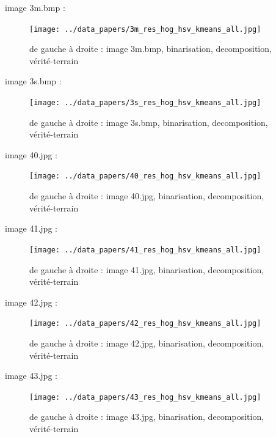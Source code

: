 \documentclass{book}
\begin{document}
image 3m.bmp : 
\begin{figure}[H]
\begin{center}
\texttt{[image: ../data\_papers/3m\_res\_hog\_hsv\_kmeans\_all.jpg]}
\end{center}
\caption{de gauche à droite : image 3m.bmp, binarisation, decomposition, vérité-terrain}
\label{3m}
\end{figure}
\clearpage


image 3s.bmp : 
\begin{figure}[H]
\begin{center}
\texttt{[image: ../data\_papers/3s\_res\_hog\_hsv\_kmeans\_all.jpg]}
\end{center}
\caption{de gauche à droite : image 3s.bmp, binarisation, decomposition, vérité-terrain}
\label{3s}
\end{figure}
\clearpage


image 40.jpg : 
\begin{figure}[H]
\begin{center}
\texttt{[image: ../data\_papers/40\_res\_hog\_hsv\_kmeans\_all.jpg]}
\end{center}
\caption{de gauche à droite : image 40.jpg, binarisation, decomposition, vérité-terrain}
\label{40}
\end{figure}
\clearpage


image 41.jpg : 
\begin{figure}[H]
\begin{center}
\texttt{[image: ../data\_papers/41\_res\_hog\_hsv\_kmeans\_all.jpg]}
\end{center}
\caption{de gauche à droite : image 41.jpg, binarisation, decomposition, vérité-terrain}
\label{41}
\end{figure}
\clearpage


image 42.jpg : 
\begin{figure}[H]
\begin{center}
\texttt{[image: ../data\_papers/42\_res\_hog\_hsv\_kmeans\_all.jpg]}
\end{center}
\caption{de gauche à droite : image 42.jpg, binarisation, decomposition, vérité-terrain}
\label{42}
\end{figure}
\clearpage


image 43.jpg : 
\begin{figure}[H]
\begin{center}
\texttt{[image: ../data\_papers/43\_res\_hog\_hsv\_kmeans\_all.jpg]}
\end{center}
\caption{de gauche à droite : image 43.jpg, binarisation, decomposition, vérité-terrain}
\label{43}
\end{figure}
\clearpage
\end{document}
